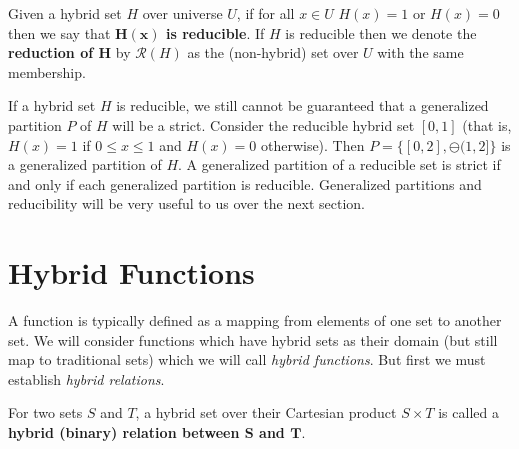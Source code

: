 \begin{definition}
Given a hybrid set $H$ over universe $U$, 
if for all $x \in U$ $H(x)=1$ or $H(x)=0$ then we say that \textbf{$\boldsymbol{H(x)}$ is reducible}.
If $H$ is reducible then we denote the \textbf{reduction of $\boldsymbol{H}$} by $\mathcal{R}(H)$ 
as the (non-hybrid) set over $U$ with the same membership.  
\end{definition}

If a hybrid set $H$ is reducible, we still cannot be guaranteed that a generalized partition $P$ of $H$ will be a strict.
Consider the reducible hybrid set $[0,1]$ (that is, $H(x)=1$ if $0 \leq x \leq 1$ and $H(x)=0$ otherwise).
Then $P = \big\{ [0,2], \ominus (1,2] \big\}$ is a generalized partition of $H$. 
A generalized partition of a reducible set is strict if and only if each generalized partition is reducible.
Generalized partitions and reducibility will be very useful to us over the next section.






%
%

\section{Hybrid Functions}

A function is typically defined as a mapping from elements of one set to another set.
We will consider functions which have hybrid sets as their domain (but still map to traditional sets) 
which we will call \emph{hybrid functions}.
But first we must establish \emph{hybrid relations}.


\begin{definition}
	For two sets $S$ and $T$, a hybrid set over their Cartesian product $S \times T$ is called a 
	\textbf{hybrid (binary) relation between $\boldsymbol{S}$ and $\boldsymbol{T}$}.
\end{definition}

